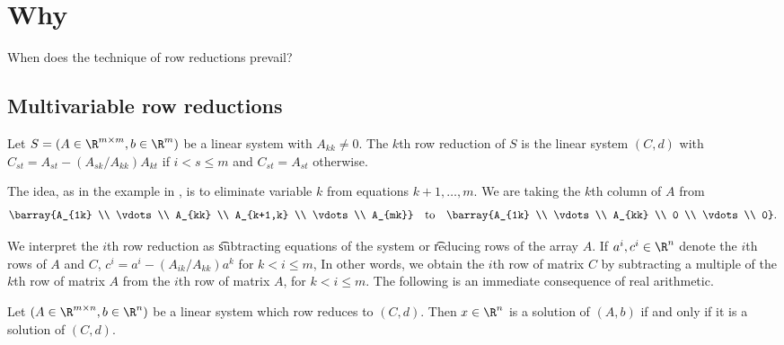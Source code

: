 

\section*{Why}

When does the technique of row reductions prevail?

\subsection*{Multivariable row reductions}

Let $S = (A \in \R ^{m \times m}, b \in \R ^{m})$ be a linear system with $A_{kk} \neq 0$.
The \t{$k$th row reduction} of $S$ is the linear system $(C, d)$ with $C_{st} = A_{st} - (A_{sk}/A_{kk})A_{kt}$ if $i < s \leq m$ and $C_{st} = A_{st}$ otherwise.

The idea, as in the example in , is to eliminate variable $k$ from equations $k+1, \dots , m$.
We are taking the $k$th column of $A$ from
\[
\barray{A_{1k} \\ \vdots \\ A_{kk} \\ A_{k+1,k} \\ \vdots \\ A_{mk}} \quad \text{to} \quad \barray{A_{1k} \\ \vdots \\ A_{kk} \\ 0 \\ \vdots \\ 0}.
\]

We interpret the $i$th row reduction as \t{subtracting equations} of the system or \t{reducing rows} of the array $A$.
If $a^i, c^i \in \R ^{n}$ denote the $i$th rows of $A$ and $C$, $c^i = a^i - (A_{ik}/A_{kk})a^k$ for $k < i \leq m$,
In other words, we obtain the $i$th row of matrix $C$ by subtracting a multiple of the $k$th row of matrix $A$ from the $i$th row of matrix $A$, for $k < i \leq m$.
The following is an immediate consequence of real arithmetic.

\begin{proposition}

\label{proposition:ordinaryrowreductions:basic}Let $(A \in \R ^{m \times  n}, b \in \R ^{n})$ be a linear system which row reduces to $(C, d)$.
Then $x \in \R ^{n}$ is a solution of $(A, b)$ if and only if it is a solution of $(C, d)$.
\end{proposition}

